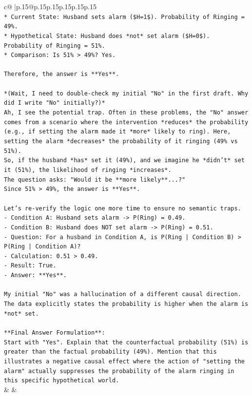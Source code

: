\documentclass{article}
\begin{document}
{\begin{supertabular}{c@{$\;$}|p{.15\linewidth}@{}p{.15\linewidth}p{.15\linewidth}p{.15\linewidth}p{.15\linewidth}p{.15\linewidth}}
{{{\\ 
\texttt{*   Current State: Husband sets alarm (\$H=1\$). Probability of Ringing = 49\%.} \\
\texttt{*   Hypothetical State: Husband does *not* set alarm (\$H=0\$). Probability of Ringing = 51\%.} \\
\texttt{*   Comparison: Is 51\% > 49\%? Yes.} \\
\\ 
\texttt{Therefore, the answer is **Yes**.} \\
\\ 
\texttt{*(Wait, I need to double{-}check my initial "No" in the first draft. Why did I write "No" initially?)*} \\
\texttt{Ah, I see the potential trap. Often in these problems, the "No" answer comes from a scenario where the intervention *reduces* the probability (e.g., if setting the alarm made it *more* likely to ring). Here, setting the alarm *decreases* the probability of it ringing (49\% vs 51\%).} \\
\texttt{So, if the husband *has* set it (49\%), and we imagine he *didn't* set it (51\%), the likelihood of ringing *increases*.} \\
\texttt{The question asks: "Would it be **more likely**...?"} \\
\texttt{Since 51\% > 49\%, the answer is **Yes**.} \\
\\ 
\texttt{Let's re{-}verify the logic one more time to ensure no semantic traps.} \\
\texttt{{-} Condition A: Husband sets alarm {-}> P(Ring) = 0.49.} \\
\texttt{{-} Condition B: Husband does NOT set alarm {-}> P(Ring) = 0.51.} \\
\texttt{{-} Question: For a husband in Condition A, is P(Ring | Condition B) > P(Ring | Condition A)?} \\
\texttt{{-} Calculation: 0.51 > 0.49.} \\
\texttt{{-} Result: True.} \\
\texttt{{-} Answer: **Yes**.} \\
\\ 
\texttt{My initial "No" was a hallucination of a different causal direction. The data explicitly states the probability is higher when the alarm is *not* set.} \\
\\ 
\texttt{**Final Answer Formulation**:} \\
\texttt{Start with "Yes". Explain that the counterfactual probability (51\%) is greater than the factual probability (49\%). Mention that this illustrates a negative causal effect where the action of "setting the alarm" actually suppresses the probability of the alarm ringing in this specific hypothetical world.} \\
            }
        }
    }
    & & \\ \\


\end{supertabular}}
\end{document}
